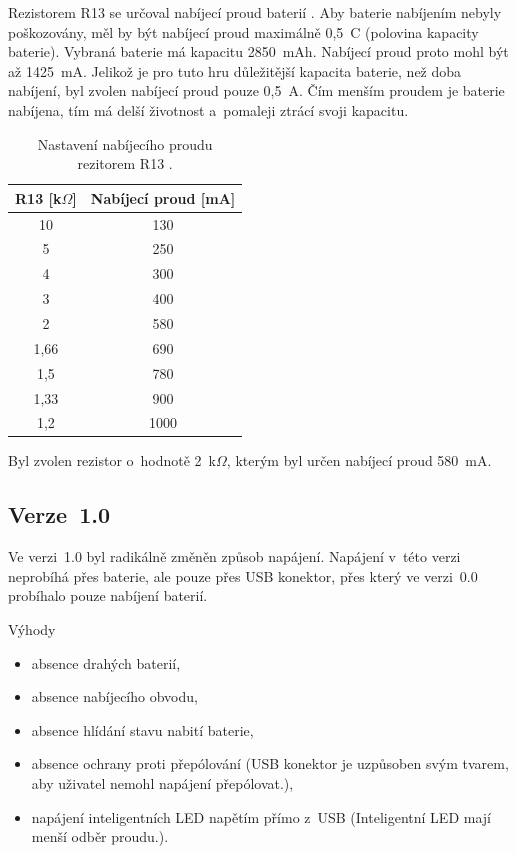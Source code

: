   Rezistorem R13 se určoval nabíjecí proud baterií \cite{TP4056_datasheet}. Aby baterie nabíjením nebyly poškozovány, měl by být nabíjecí 
  proud maximálně 0,5~C (polovina kapacity baterie). Vybraná baterie má kapacitu 2850~mAh. Nabíjecí proud proto mohl být až 1425~mA. 
  Jelikož je pro tuto hru důležitější kapacita baterie, než doba nabíjení, byl zvolen nabíjecí proud pouze 0,5~A. Čím menším proudem 
  je baterie nabíjena, tím má delší životnost a~pomaleji ztrácí svoji kapacitu.

  \begin{table}[!h]
    \caption{Nastavení nabíjecího proudu rezitorem R13 \cite{TP4056_datasheet}.}
    \begin{center}
      \begin{tabular}{|c|c|}
          \hline
          R13 [k$\Omega$] & Nabíjecí proud [mA] \\
          \hline
          10      & 130 \\
          \hline
          5       & 250 \\
          \hline
          4       & 300 \\
          \hline
          3       & 400 \\
          \hline
          2       & 580 \\
          \hline
          1,66    & 690 \\
          \hline
          1,5     & 780 \\
          \hline
          1,33    & 900 \\
          \hline
          1,2     & 1000 \\
          \hline
      \end{tabular}  
    \end{center}
  \end{table}

  Byl zvolen rezistor o~hodnotě 2~k$\Omega$, kterým byl určen nabíjecí proud 580~mA. 

  \subsection{Verze~1.0}
  Ve verzi~1.0 byl radikálně změněn způsob napájení. Napájení v~této verzi neprobíhá přes baterie, ale pouze přes USB konektor, přes 
  který ve verzi~0.0 probíhalo pouze nabíjení baterií. 

  Výhody
  \begin{itemize}
    \item absence drahých baterií,
    \item absence nabíjecího obvodu,
    \item absence hlídání stavu nabití baterie,
    \item absence ochrany proti přepólování (USB konektor je uzpůsoben svým tvarem, aby uživatel nemohl napájení přepólovat.),
    \item napájení inteligentních LED napětím přímo z~USB (Inteligentní LED mají menší odběr proudu.).
  \end{itemize}

